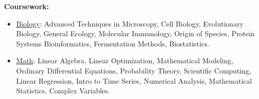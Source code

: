\textbf{Coursework:}

\begin{itemize}[noitemsep]
\item \ul{Biology}: Advanced Techniques in Microscopy, Cell Biology, Evolutionary Biology, General Ecology, Molecular Immunology, Origin of Species, Protein Systems Bioinformatics, Fermentation Methods, Biostatistics.
\item \ul{Math}: Linear Algebra, Linear Optimization, Mathematical Modeling, Ordinary Differential Equations, Probability Theory, Scientific Computing, Linear Regression, Intro to Time Series, Numerical Analysis, Mathematical Statistics, Complex Variables.
\end{itemize}